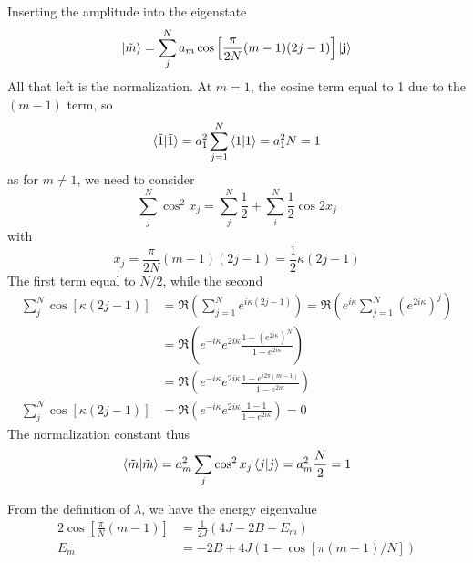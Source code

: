 \documentclass[../../../main.tex]{subfiles}
\begin{document}
Inserting the amplitude into the eigenstate
\begin{equation*}
    \ket{\tilde{m}  } =
    \sum_{j }^N a_m \cos \left[ \frac{\pi }{2 N }(m-1 )(2j-1) \right] \ket{\mathbf{j}}
\end{equation*}
All that left is the normalization.
At $m=1$, the cosine term equal to 1 due to the $(m-1)$ term, so
\begin{equation*}
    \braket{\tilde{1}| \tilde{1}}
    = a_1^2 \sum_{j=1}^N \braket{1 |1} = a_1^2 N  =1
\end{equation*}
as for $m \neq 1$, we need to consider
\begin{equation*}
    \sum_{j } ^{N } \cos ^2 x_j = \sum_{j } ^{N } \frac{1 }{2 } + \sum_{i } ^{N } \frac{1 }{2 }\cos 2x_j
\end{equation*}
with
\begin{equation*}
    x_j =  \frac{\pi }{2 N }(m-1 )(2j-1) = \frac{1 }{2 } \kappa (2j-1)
\end{equation*}
The first term equal to $N/2$, while the second
\begin{align*}
    \sum_{j } ^{N } \cos [\kappa(2j-1)] & =  \Re\left(\sum_{j=1}^{N} e^{i\kappa (2j-1)}\right)  = \Re\left(e ^{i\kappa }\sum_{j=1}^{N} (e^{2i\kappa })^j\right) \\
                                        & =\Re \left(  e^{-i\kappa } e^{2i\kappa } \frac{1 - (e^{2i\kappa })^{N}}{1 - e^{2i\kappa }} \right)                    \\
                                        & =  \Re \left( e^{-i\kappa } e^{2i\kappa } \frac{1 -  e^{i2\pi(m-1)}}{1 - e^{2i\kappa }} \right)                       \\
    \sum_{j } ^{N } \cos [\kappa(2j-1)] & =  \Re \left(  e^{-i\kappa } e ^{2i \kappa} \frac{1 -  1}{1 - e^{2i\kappa }}  \right) = 0
\end{align*}
The normalization constant thus
\begin{equation*}
    \braket{\tilde{m }  | \tilde{m } } = a_m^2  \sum_{j} \cos ^2 x_j \braket{j  | j} = a_m ^2 \frac{N }{2} =1
\end{equation*}

From the definition of $\lambda$, we have the energy eigenvalue
\begin{align*}
    2 \cos \left[ \frac{\pi }{N }(m-1)  \right] & = \frac{1 }{2J} \left( 4J -2B - E_m \right) \\
    E_m                                         & = -2B + 4J(1- \cos [\pi(m-1)/N])
\end{align*}
\end{document}
